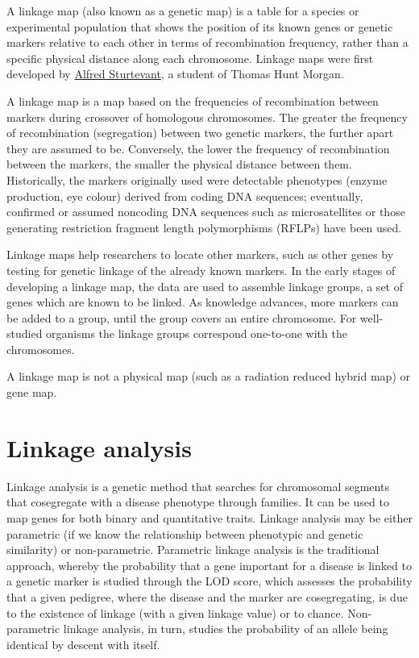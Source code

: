 A linkage map (also known as a genetic map) is a table for a species or experimental population that shows the position of its known genes or genetic markers relative to each other in terms of recombination frequency, rather than a specific physical distance along each chromosome. Linkage maps were first developed by \href{https://en.wikipedia.org/wiki/Alfred_Sturtevant}{Alfred Sturtevant}, a student of Thomas Hunt Morgan.

A linkage map is a map based on the frequencies of recombination between markers during crossover of homologous chromosomes. The greater the frequency of recombination (segregation) between two genetic markers, the further apart they are assumed to be. Conversely, the lower the frequency of recombination between the markers, the smaller the physical distance between them. Historically, the markers originally used were detectable phenotypes (enzyme production, eye colour) derived from coding DNA sequences; eventually, confirmed or assumed noncoding DNA sequences such as microsatellites or those generating restriction fragment length polymorphisms (RFLPs) have been used.

Linkage maps help researchers to locate other markers, such as other genes by testing for genetic linkage of the already known markers. In the early stages of developing a linkage map, the data are used to assemble linkage groups, a set of genes which are known to be linked. As knowledge advances, more markers can be added to a group, until the group covers an entire chromosome. For well-studied organisms the linkage groups correspond one-to-one with the chromosomes.

A linkage map is not a physical map (such as a radiation reduced hybrid map) or gene map.

\hypertarget{linkage-analysis}{%
\section{Linkage analysis}\label{linkage-analysis}}

Linkage analysis is a genetic method that searches for chromosomal segments that cosegregate with a disease phenotype through families. It can be used to map genes for both binary and quantitative traits. Linkage analysis may be either parametric (if we know the relationship between phenotypic and genetic similarity) or non-parametric. Parametric linkage analysis is the traditional approach, whereby the probability that a gene important for a disease is linked to a genetic marker is studied through the LOD score, which assesses the probability that a given pedigree, where the disease and the marker are cosegregating, is due to the existence of linkage (with a given linkage value) or to chance. Non-parametric linkage analysis, in turn, studies the probability of an allele being identical by descent with itself.

